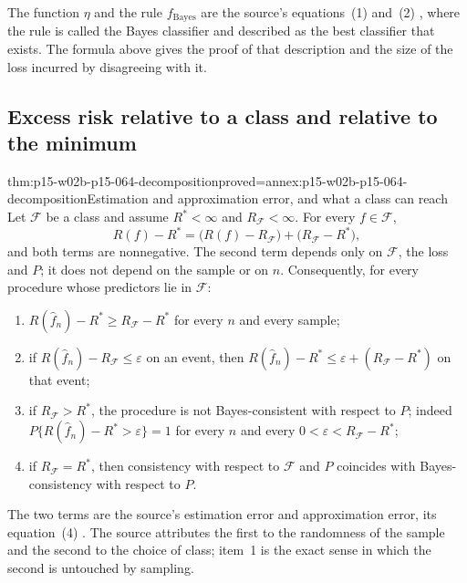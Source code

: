 The function \(\eta\) and the rule \(f_{\mathrm{Bayes}}\) are the source's
equations~(1) and~(2) \cite[Section~2.2, pp.~3 and~5]{LuxburgScholkopf2008Author},
where the rule is called the Bayes classifier and described as the best
classifier that exists. The formula above gives the proof of that description
and the size of the loss incurred by disagreeing with it.

\subsection{Excess risk relative to a class and relative to the minimum}

\begin{hbtheorem}{thm:p15-w02b-p15-064-decomposition}{proved=annex:p15-w02b-p15-064-decomposition}{Estimation and approximation error, and what a class can reach}
Let \(\mathcal F\) be a class and assume \(R^{*}<\infty\) and
\(R_{\mathcal F}<\infty\). For every \(f\in\mathcal F\),
\[
 R(f)-R^{*}=\bigl(R(f)-R_{\mathcal F}\bigr)+\bigl(R_{\mathcal F}-R^{*}\bigr),
\]
and both terms are nonnegative. The second term depends only on
\(\mathcal F\), the loss and \(P\); it does not depend on the sample or on
\(n\). Consequently, for every procedure whose predictors lie in
\(\mathcal F\):
\begin{enumerate}
\item \(R(\widehat f_n)-R^{*}\geq R_{\mathcal F}-R^{*}\) for every \(n\) and
      every sample;
\item if \(R(\widehat f_n)-R_{\mathcal F}\leq\varepsilon\) on an event, then
      \(R(\widehat f_n)-R^{*}\leq\varepsilon+(R_{\mathcal F}-R^{*})\) on that
      event;
\item if \(R_{\mathcal F}>R^{*}\), the procedure is not Bayes-consistent with
      respect to \(P\); indeed
      \(P\{R(\widehat f_n)-R^{*}>\varepsilon\}=1\) for every \(n\) and every
      \(0<\varepsilon<R_{\mathcal F}-R^{*}\);
\item if \(R_{\mathcal F}=R^{*}\), then consistency with respect to
      \(\mathcal F\) and \(P\) coincides with Bayes-consistency with
      respect to \(P\).
\end{enumerate}
\end{hbtheorem}

The two terms are the source's estimation error and approximation error,
its equation~(4) \cite[Section~2.4, p.~9]{LuxburgScholkopf2008Author}.
The source attributes the first to the randomness of the sample and the
second to the choice of class; item~1 is the exact sense in which the second
is untouched by sampling.

